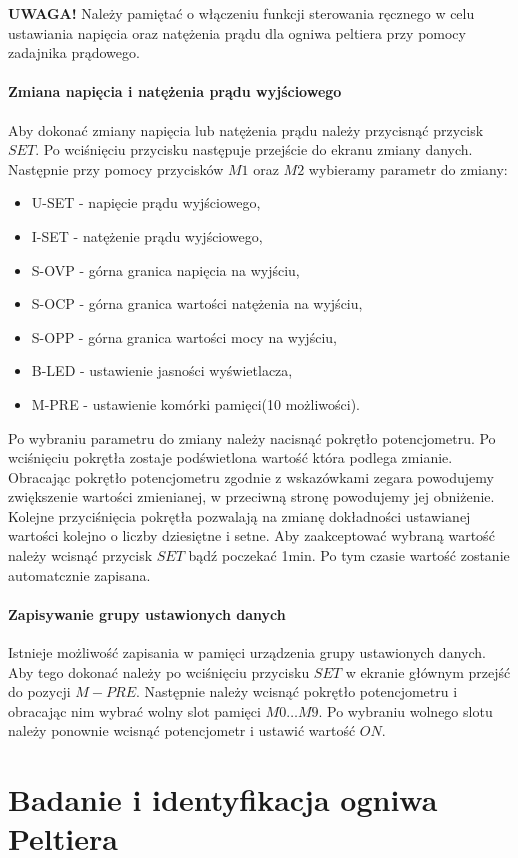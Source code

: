 \documentclass[oneside]{mgr}
\begin{document}
\textbf{UWAGA!} Należy pamiętać o włączeniu funkcji sterowania ręcznego w celu ustawiania napięcia oraz natężenia prądu dla ogniwa peltiera przy pomocy zadajnika prądowego.
\subsubsection{Zmiana napięcia i natężenia prądu wyjściowego}
Aby dokonać zmiany napięcia lub natężenia prądu należy przycisnąć przycisk $SET$. Po wciśnięciu przycisku następuje przejście do ekranu zmiany danych. Następnie przy pomocy przycisków $M1$ oraz $M2$ wybieramy parametr do zmiany:
\begin{itemize}
    \item U-SET - napięcie prądu wyjściowego,
    \item I-SET - natężenie prądu wyjściowego,
    \item S-OVP - górna granica napięcia na wyjściu,
    \item S-OCP - górna granica wartości natężenia na wyjściu,
    \item S-OPP - górna granica wartości mocy na wyjściu,
    \item B-LED - ustawienie jasności wyświetlacza,
    \item M-PRE - ustawienie komórki pamięci(10 możliwości).
\end{itemize}
Po wybraniu parametru do zmiany należy nacisnąć pokrętło potencjometru. Po wciśnięciu pokrętła zostaje podświetlona wartość która podlega zmianie. Obracając pokrętło potencjometru zgodnie z wskazówkami zegara powodujemy zwiększenie wartości zmienianej, w przeciwną stronę powodujemy jej obniżenie. Kolejne przyciśnięcia pokrętła pozwalają na zmianę dokładności ustawianej wartości kolejno o liczby dziesiętne i setne. Aby zaakceptować wybraną wartość należy wcisnąć przycisk $SET$ bądź poczekać 1min. Po tym czasie wartość zostanie automatcznie zapisana.
\subsubsection{Zapisywanie grupy ustawionych danych}
Istnieje możliwość zapisania w pamięci urządzenia grupy ustawionych danych. Aby tego dokonać należy po wciśnięciu przycisku $SET$ w ekranie głównym przejść do pozycji $M-PRE$. Następnie należy wcisnąć pokrętło potencjometru i obracając nim wybrać wolny slot pamięci $M0\dots M9$. Po wybraniu wolnego slotu należy ponownie wcisnąć potencjometr i ustawić wartość $ON$.


\chapter{Badanie i identyfikacja ogniwa Peltiera}
\end{document}
